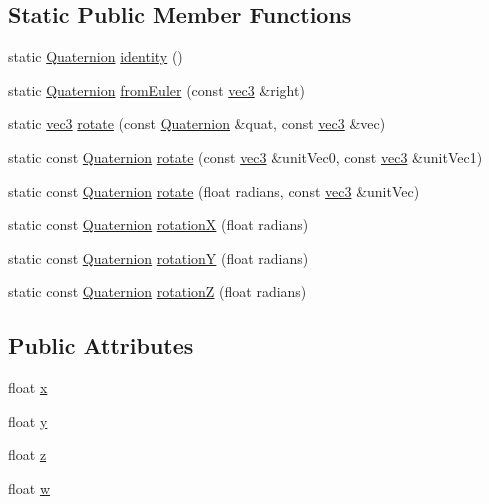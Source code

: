 \subsection*{Static Public Member Functions}
\begin{DoxyCompactItemize}
\item 
static \hyperlink{structspork_1_1maths_1_1_quaternion}{Quaternion} \hyperlink{structspork_1_1maths_1_1_quaternion_a852176a071c37d949a20f60240f4f977}{identity} ()
\item 
static \hyperlink{structspork_1_1maths_1_1_quaternion}{Quaternion} \hyperlink{structspork_1_1maths_1_1_quaternion_a45e3e18757f677e4c4b0207eafaa4751}{from\+Euler} (const \hyperlink{structspork_1_1maths_1_1vec3}{vec3} \&right)
\item 
static \hyperlink{structspork_1_1maths_1_1vec3}{vec3} \hyperlink{structspork_1_1maths_1_1_quaternion_a79245c7e245957602094ecf507e3cdc2}{rotate} (const \hyperlink{structspork_1_1maths_1_1_quaternion}{Quaternion} \&quat, const \hyperlink{structspork_1_1maths_1_1vec3}{vec3} \&vec)
\item 
static const \hyperlink{structspork_1_1maths_1_1_quaternion}{Quaternion} \hyperlink{structspork_1_1maths_1_1_quaternion_a7746e864306c3844725c96575f7282cd}{rotate} (const \hyperlink{structspork_1_1maths_1_1vec3}{vec3} \&unit\+Vec0, const \hyperlink{structspork_1_1maths_1_1vec3}{vec3} \&unit\+Vec1)
\item 
static const \hyperlink{structspork_1_1maths_1_1_quaternion}{Quaternion} \hyperlink{structspork_1_1maths_1_1_quaternion_ae769335030acc9889db670ec3fcf9da2}{rotate} (float radians, const \hyperlink{structspork_1_1maths_1_1vec3}{vec3} \&unit\+Vec)
\item 
static const \hyperlink{structspork_1_1maths_1_1_quaternion}{Quaternion} \hyperlink{structspork_1_1maths_1_1_quaternion_ab9d8fd8220c2f355b675a7ed2cdaee68}{rotationX} (float radians)
\item 
static const \hyperlink{structspork_1_1maths_1_1_quaternion}{Quaternion} \hyperlink{structspork_1_1maths_1_1_quaternion_a6e59b5c395cb7fdfaa902d4fb204d0c3}{rotationY} (float radians)
\item 
static const \hyperlink{structspork_1_1maths_1_1_quaternion}{Quaternion} \hyperlink{structspork_1_1maths_1_1_quaternion_a6d63a4fce870d6eebfe41bce244a6123}{rotationZ} (float radians)
\end{DoxyCompactItemize}
\subsection*{Public Attributes}
\begin{DoxyCompactItemize}
\item 
float \hyperlink{structspork_1_1maths_1_1_quaternion_ac9a551c42de0a7acd0c54bb18d1863e5}{x}
\item 
float \hyperlink{structspork_1_1maths_1_1_quaternion_ac6a591cc6515fd357cbc1a4ad49ea667}{y}
\item 
float \hyperlink{structspork_1_1maths_1_1_quaternion_a34c6708dbdf1e1e537d034fdab001584}{z}
\item 
float \hyperlink{structspork_1_1maths_1_1_quaternion_a5497dc08d45d86aa8faa956df16cb4b1}{w}
\end{DoxyCompactItemize}


